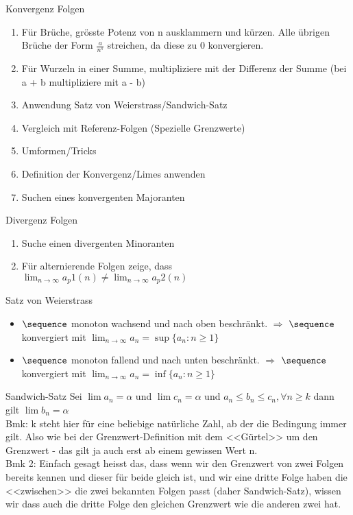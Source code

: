\begin{KR}{Konvergenz Folgen}
    \begin{enumerate}
        \item Für Brüche, grösste Potenz von n ausklammern und kürzen. Alle übrigen Brüche der Form $\frac{a}{n^s}$ streichen, da diese zu 0 konvergieren.
        \item Für Wurzeln in einer Summe, multipliziere mit der Differenz der Summe (bei a + b multipliziere mit a - b)
        \item Anwendung Satz von Weierstrass/Sandwich-Satz 
        \item Vergleich mit Referenz-Folgen (Spezielle Grenzwerte)
        \item Umformen/Tricks
        \item Definition der Konvergenz/Limes anwenden
        \item Suchen eines konvergenten Majoranten
    \end{enumerate}
\end{KR}
\begin{KR}{Divergenz Folgen}
    \begin{enumerate}
        \item  Suche einen divergenten Minoranten
        \item Für alternierende Folgen zeige, dass \\$\lim_{n \to \infty} a_p1(n) \neq \lim_{n \to \infty} a_p2(n)$
    \end{enumerate}
\end{KR}



\begin{concept}{Satz von Weierstrass}
    \begin{itemize}
        \item $\sequence$ monoton wachsend und nach oben beschränkt. $\Rightarrow$ $\sequence$ konvergiert mit $\lim_{n \to \infty} a_n = \sup \{a_n : n \geq 1\}$
        \item $\sequence$ monoton fallend und nach unten beschränkt. $\Rightarrow$ $\sequence$ konvergiert mit $\lim_{n \to \infty} a_n = \inf \{a_n : n \geq 1\}$
    \end{itemize}
\end{concept}

\begin{theorem}{Sandwich-Satz}
    Sei $\lim a_n = \alpha$ und $\lim c_n = \alpha$ und $a_n \leq b_n \leq c_n, \forall n \geq k$ dann gilt $\lim b_n = \alpha$\\
    Bmk: k steht hier für eine beliebige natürliche Zahl, ab der die Bedingung immer gilt. Also wie bei der Grenzwert-Definition mit dem <<Gürtel>> um den Grenzwert - das gilt ja auch erst ab einem gewissen Wert n.\\
    Bmk 2: Einfach gesagt heisst das, dass wenn wir den Grenzwert von zwei Folgen bereits kennen und dieser für beide gleich ist, und wir eine dritte Folge haben die <<zwischen>> die zwei bekannten Folgen passt (daher Sandwich-Satz), wissen wir dass auch die dritte Folge den gleichen Grenzwert wie die anderen zwei hat.
\end{theorem}    

